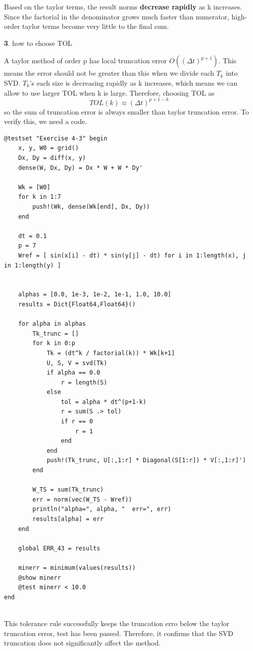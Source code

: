 \documentclass[11pt]{article}
\begin{document}
Based on the taylor terms, the result norms \textbf{decrease rapidly} as k increases. Since the factorial in the denominator grows much faster than numerator, high-order taylor terms become very little to the final sum.
\vspace{1.5em}

\textbf{3}. how to choose TOL

A taylor method of order p has local truncation error $O((\Delta t)^{p+1})$. This means the error should not be greater than this when we divide each $T_k$ into SVD. $T_k$'s each size is decreasing rapidly as k increases, which means we can allow to use larger TOL when k is large. Therefore, choosing TOL as 
\[
TOL(k) \approx (\Delta t)^{p+1-k}
\]
so the sum of truncation error is always smaller than taylor truncation error. 
To verify this, we need a code.

\begin{lstlisting}
@testset "Exercise 4-3" begin
    x, y, W0 = grid()
    Dx, Dy = diff(x, y)
    dense(W, Dx, Dy) = Dx * W + W * Dy'

    Wk = [W0]
    for k in 1:7
        push!(Wk, dense(Wk[end], Dx, Dy))
    end

    dt = 0.1
    p = 7
    Wref = [ sin(x[i] - dt) * sin(y[j] - dt) for i in 1:length(x), j in 1:length(y) ]


    alphas = [0.0, 1e-3, 1e-2, 1e-1, 1.0, 10.0]
    results = Dict{Float64,Float64}()

    for alpha in alphas
        Tk_trunc = []
        for k in 0:p
            Tk = (dt^k / factorial(k)) * Wk[k+1]
            U, S, V = svd(Tk)
            if alpha == 0.0
                r = length(S)
            else
                tol = alpha * dt^(p+1-k)
                r = sum(S .> tol)
                if r == 0
                    r = 1
                end
            end
            push!(Tk_trunc, U[:,1:r] * Diagonal(S[1:r]) * V[:,1:r]')
        end

        W_TS = sum(Tk_trunc)
        err = norm(vec(W_TS - Wref))
        println("alpha=", alpha, "  err=", err)
        results[alpha] = err
    end

    global ERR_43 = results
    
    minerr = minimum(values(results))
    @show minerr
    @test minerr < 10.0
end
  
\end{lstlisting}
This tolerance rule successfully keeps the truncation erro below the taylor truncation error, test has been passed. Therefore, it confirms that the SVD truncation does not significantly affect the method.
\end{document}

